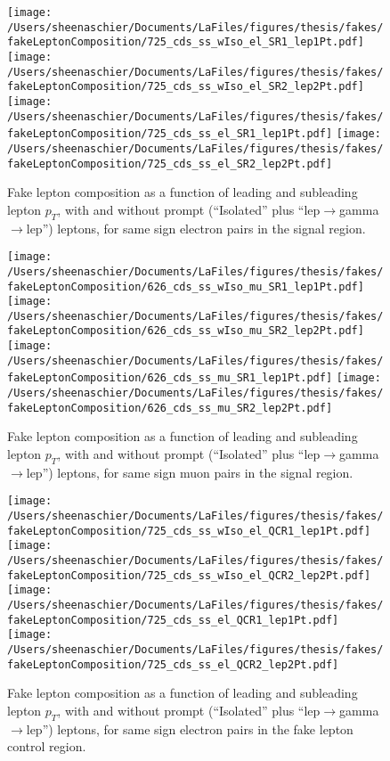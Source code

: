 \begin{figure}[htb]
        \centering
        \texttt{[image: /Users/sheenaschier/Documents/LaFiles/figures/thesis/fakes/fakeLeptonComposition/725\_cds\_ss\_wIso\_el\_SR1\_lep1Pt.pdf]}
        \texttt{[image: /Users/sheenaschier/Documents/LaFiles/figures/thesis/fakes/fakeLeptonComposition/725\_cds\_ss\_wIso\_el\_SR2\_lep2Pt.pdf]}
        \texttt{[image: /Users/sheenaschier/Documents/LaFiles/figures/thesis/fakes/fakeLeptonComposition/725\_cds\_ss\_el\_SR1\_lep1Pt.pdf]}
        \texttt{[image: /Users/sheenaschier/Documents/LaFiles/figures/thesis/fakes/fakeLeptonComposition/725\_cds\_ss\_el\_SR2\_lep2Pt.pdf]}
        \caption{Fake lepton composition as a function of leading and subleading lepton $p_{T}$, with and without prompt (``Isolated'' plus ``lep$\to$gamma$\to$lep'') leptons, for same sign electron pairs in the signal region.}
        \label{fig:elSSSR}
\end{figure}
\begin{figure}[htb]
        \centering
        \texttt{[image: /Users/sheenaschier/Documents/LaFiles/figures/thesis/fakes/fakeLeptonComposition/626\_cds\_ss\_wIso\_mu\_SR1\_lep1Pt.pdf]}
        \texttt{[image: /Users/sheenaschier/Documents/LaFiles/figures/thesis/fakes/fakeLeptonComposition/626\_cds\_ss\_wIso\_mu\_SR2\_lep2Pt.pdf]}
        \texttt{[image: /Users/sheenaschier/Documents/LaFiles/figures/thesis/fakes/fakeLeptonComposition/626\_cds\_ss\_mu\_SR1\_lep1Pt.pdf]}
        \texttt{[image: /Users/sheenaschier/Documents/LaFiles/figures/thesis/fakes/fakeLeptonComposition/626\_cds\_ss\_mu\_SR2\_lep2Pt.pdf]}
        \caption{Fake lepton composition as a function of leading and subleading lepton $p_{T}$, with and without prompt (``Isolated'' plus ``lep$\to$gamma$\to$lep'') leptons, for same sign muon pairs in the signal region.}
        \label{fig:muSSSR}
\end{figure}
\begin{figure}[htb]
        \centering
        \texttt{[image: /Users/sheenaschier/Documents/LaFiles/figures/thesis/fakes/fakeLeptonComposition/725\_cds\_ss\_wIso\_el\_QCR1\_lep1Pt.pdf]}
        \texttt{[image: /Users/sheenaschier/Documents/LaFiles/figures/thesis/fakes/fakeLeptonComposition/725\_cds\_ss\_wIso\_el\_QCR2\_lep2Pt.pdf]}
        \texttt{[image: /Users/sheenaschier/Documents/LaFiles/figures/thesis/fakes/fakeLeptonComposition/725\_cds\_ss\_el\_QCR1\_lep1Pt.pdf]}
        \texttt{[image: /Users/sheenaschier/Documents/LaFiles/figures/thesis/fakes/fakeLeptonComposition/725\_cds\_ss\_el\_QCR2\_lep2Pt.pdf]}
        \caption{Fake lepton composition as a function of leading and subleading lepton $p_{T}$, with and without prompt (``Isolated'' plus ``lep$\to$gamma$\to$lep'') leptons, for same sign electron pairs in the fake lepton control region.}
        \label{fig:elSSCR}
\end{figure}
